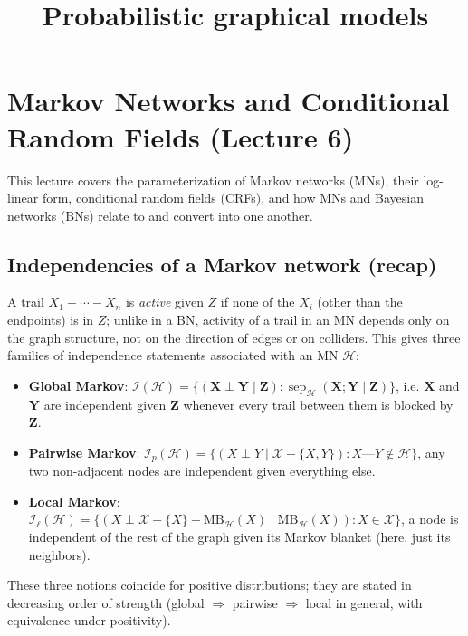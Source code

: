\documentclass[11pt]{article}
\title{Probabilistic graphical models}
\author{}
\date{}
\begin{document}
\maketitle

\section{Markov Networks and Conditional Random Fields (Lecture 6)}

This lecture covers the parameterization of Markov networks (MNs), their
log-linear form, conditional random fields (CRFs), and how MNs and Bayesian
networks (BNs) relate to and convert into one another.

\subsection{Independencies of a Markov network (recap)}

A trail $X_1 - \cdots - X_n$ is \emph{active} given $Z$ if none of the
$X_i$ (other than the endpoints) is in $Z$; unlike in a BN, activity of a
trail in an MN depends only on the graph structure, not on the direction of
edges or on colliders. This gives three families of independence statements
associated with an MN $\mathcal{H}$:

\begin{itemize}
  \item \textbf{Global Markov}: $\mathcal{I}(\mathcal{H}) =
    \{(\mathbf{X} \perp \mathbf{Y} \mid \mathbf{Z}) :
    \operatorname{sep}_{\mathcal{H}}(\mathbf{X}; \mathbf{Y} \mid \mathbf{Z})\}$,
    i.e. $\mathbf{X}$ and $\mathbf{Y}$ are independent given $\mathbf{Z}$
    whenever every trail between them is blocked by $\mathbf{Z}$.
  \item \textbf{Pairwise Markov}: $\mathcal{I}_p(\mathcal{H}) =
    \{(X \perp Y \mid \mathcal{X} - \{X,Y\}) : X\text{---}Y \notin \mathcal{H}\}$,
    any two non-adjacent nodes are independent given everything else.
  \item \textbf{Local Markov}: $\mathcal{I}_\ell(\mathcal{H}) =
    \{(X \perp \mathcal{X} - \{X\} - \mathrm{MB}_{\mathcal{H}}(X) \mid
    \mathrm{MB}_{\mathcal{H}}(X)) : X \in \mathcal{X}\}$, a node is
    independent of the rest of the graph given its Markov blanket (here,
    just its neighbors).
\end{itemize}

These three notions coincide for positive distributions; they are stated in
decreasing order of strength (global $\Rightarrow$ pairwise $\Rightarrow$
local in general, with equivalence under positivity).
\end{document}
